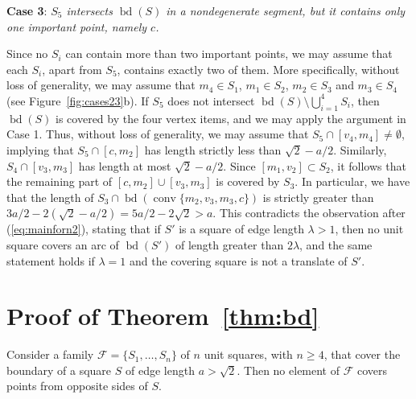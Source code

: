 \documentclass[twoside]{amsart}
\DeclareMathOperator{\conv}{conv}
\DeclareMathOperator{\bd}{bd}
\begin{document}
\smallskip

\textbf{Case 3}: \emph{$S_5$ intersects
$\bd(S)$ in a nondegenerate segment, but it contains only one important point, namely $c$.}

Since no $S_i$ can contain more than two important points, we may assume that each $S_i$, apart from $S_5$, contains exactly two of them. More specifically, without loss of generality, we may assume that $m_4 \in S_1$, $m_1 \in S_2$, $m_2 \in S_3$ and $m_3 \in S_4$ (see Figure~\ref{fig:cases23}b). If $S_5$ does not intersect $\bd(S) \setminus \bigcup_{i=1}^4 S_i$, then $\bd(S)$ is covered by the four vertex items, and we may apply the argument in Case 1. Thus, without loss of generality, we may assume that $S_5 \cap [v_4,m_4] \neq \emptyset$, implying that $S_5 \cap [c,m_2]$ has length strictly less than $\sqrt{2}-a/2$. Similarly, $S_4 \cap [v_3,m_3]$ has length at most $\sqrt{2}-a/2$. Since $[m_1,v_2] \subset S_2$, it follows that the remaining part of $[c,m_2] \cup [v_3,m_3]$ is covered by $S_3$. In particular, we have that the length of $S_3 \cap \bd(\conv \{ m_2,v_3,m_3,c \})$ is strictly greater than $3a/2-2(\sqrt{2}-a/2)=5a/2-2\sqrt{2} > a$. This contradicts the observation after (\ref{eq:mainforn2}), stating that if $S'$ is a square of edge length $\lambda > 1$, then no unit square covers an arc of $\bd(S')$ of length greater than
$2\lambda$, and the same statement holds if $\lambda=1$ and the covering square is not a translate of $S'$. 




\section{Proof of Theorem~\ref{thm:bd}}\label{sec:bd}

Consider a family $\mathcal{F}= \{ S_1, \ldots, S_n \}$ of $n$ unit squares, with $n \geq 4$, that cover the boundary of a square $S$ of edge length $a > \sqrt{2}$. Then no element of $\mathcal{F}$ covers points from opposite sides of $S$.
\end{document}

